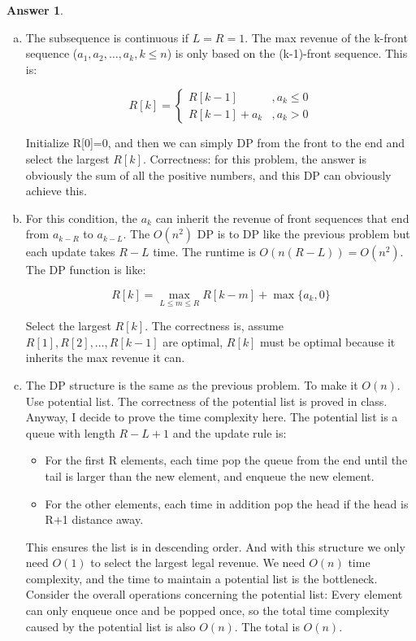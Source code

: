 \documentclass{article}
\theoremstyle{definition}
\newtheorem{ans}{Answer}
\begin{document}
	\begin{ans}
		~
		
		\begin{enumerate}[(a)]
			\item The subsequence is continuous if $L=R=1$. The max revenue of the k-front sequence ($a_{1}, a_{2}, \ldots, a_{k}, k\leq n$) is only based on the (k-1)-front sequence. This is:
			
			$$
			R[k]=
			\begin{cases}
				R[k-1] &, a_k\leq0\\
				R[k-1]+a_k &, a_k>0
			\end{cases}
			$$
			
			Initialize R[0]=0, and then we can simply DP from the front to the end and select the largest $R[k]$. Correctness: for this problem, the answer is obviously the sum of all the positive numbers, and this DP can obviously achieve this. 
			\item For this condition, the $a_k$ can inherit the revenue of front sequences that end from $a_{k-R}$ to $a_{k-L}$. The $O(n^2)$ DP is to DP like the previous problem but each update takes $R-L$ time. The runtime is $O(n(R-L))=O(n^2)$. The DP function is like:
			
			$$
			R[k]=\underset{L\leq m \leq R}{\max}R[k-m]+\max\{a_k, 0\}
			$$
			
			Select the largest $R[k]$. The correctness is, assume $R[1], R[2], \ldots, R[k-1]$ are optimal, $R[k]$ must be optimal because it inherits the max revenue it can. 
			
			\item The DP structure is the same as the previous problem. To make it $O(n)$. Use potential list. The correctness of the potential list is proved in class. Anyway, I decide to prove the time complexity here. The potential list is a queue with length $R-L+1$ and the update rule is:
			\begin{itemize}
				\item For the first R elements, each time pop the queue from the end until the tail is larger than the new element, and enqueue the new element. 
				\item For the other elements, each time in addition pop the head if the head is R+1 distance away. 
			\end{itemize}
		
			This ensures the list is in descending order. And with this structure we only need $O(1)$ to select the largest legal revenue. We need $O(n)$ time complexity, and the time to maintain a potential list is the bottleneck. Consider the overall operations concerning the potential list: Every element can only enqueue once and be popped once, so the total time complexity caused by the potential list is also $O(n)$. The total is $O(n)$.
		\end{enumerate}
	\end{ans}
	
\end{document}
